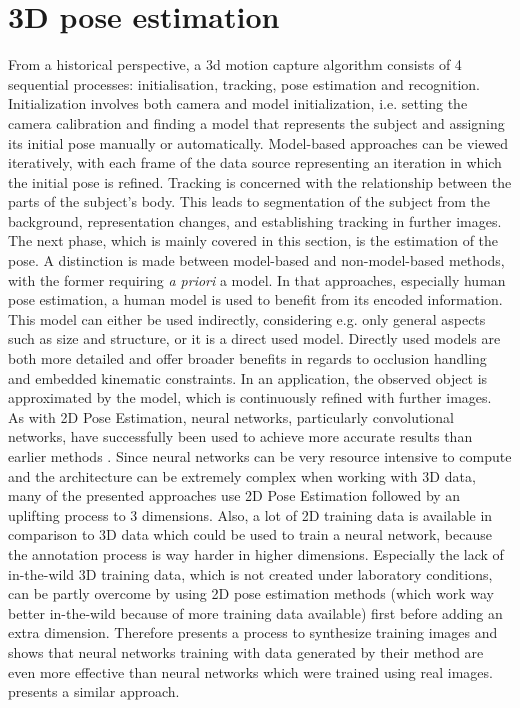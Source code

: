 \section{3D pose estimation}
From a historical perspective, a 3d motion capture algorithm consists of 4 sequential processes: initialisation, tracking, pose estimation and recognition. Initialization involves both camera and model initialization, i.e. setting the camera calibration and finding a model that represents the subject and assigning its initial pose manually or automatically. Model-based approaches can be viewed iteratively, with each frame of the data source representing an iteration in which the initial pose is refined. Tracking is concerned with the relationship between the parts of the subject's body. This leads to segmentation of the subject from the background, representation changes, and establishing tracking in further images. The next phase, which is mainly covered in this section, is the estimation of the pose. A distinction is made between model-based and non-model-based methods, with the former requiring  \emph{a priori} a model. In that approaches, especially human pose estimation, a human model is used to benefit from its encoded information. This model can either be used indirectly, considering e.g. only general aspects such as size and structure, or it is a direct used model. Directly used models are both more detailed and offer broader benefits in regards to occlusion handling and embedded kinematic constraints. In an application, the observed object is approximated by the model, which is continuously refined with further images.\cite{summary80s}
\\
As with 2D Pose Estimation, neural networks, particularly convolutional networks, have successfully been used to achieve more accurate results than earlier methods \cite{wang_deep_2021, Chen2016, Chen_2017_CVPR, Tome_2017_CVPR, Andrikula2010, Ye2011, Martinez_2017_ICCV}. Since neural networks can be very resource intensive to compute and the architecture can be extremely complex when working with 3D data, many  of the presented approaches use 2D Pose Estimation followed by an uplifting process to 3 dimensions.  Also, a lot of 2D training data is available in comparison to 3D data which could be used to train a neural network, because the annotation process is way harder in higher dimensions. Especially the lack of in-the-wild 3D training data, which is not created under laboratory conditions, can be partly overcome by using 2D pose estimation methods (which work way better in-the-wild because of more training data available) first before adding an extra dimension.
 Therefore \cite{Chen2016} presents a process to synthesize training images and shows that neural networks training with data generated by their method are even more effective than neural networks which were trained using real images. \cite{Rogez2016} presents a similar approach.

